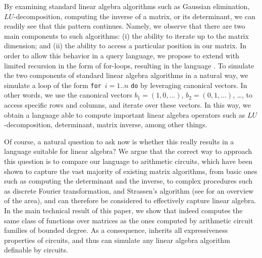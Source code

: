 By
examining standard linear algebra algorithms such as Gaussian elimination, $LU$-decomposition, computing the inverse of a matrix, or its determinant, we can readily see that this pattern continues. Namely, we observe that there are two main components to such algorithms: (i) the ability to iterate up to the matrix dimension; and (ii) the ability to access a particular position in our matrix. In order to allow this behavior in a query language, we propose to extend \lang with limited recursion in the form of for-loops, resulting in the language \langfor. To  simulate the two components of standard linear algebra algorithms in a natural way, we simulate a loop of the form \texttt{for}\, $i=1..n$ \texttt{do} by leveraging canonical vectors. In other words, we use the canonical vectors $b_1=(1,0,\ldots)$, $b_2=(0,1,\ldots)$, \ldots, to access specific rows and columns, and iterate over these vectors. In this way,
we obtain a language able to compute important linear algebra operators such as $LU$-decomposition, determinant, matrix inverse, among other things.

Of course, a natural question to ask now is whether this really results in a language suitable for linear algebra? We argue that the correct way to approach this question is to compare our language to arithmetic circuits, which have been shown to capture the vast majority of existing matrix algorithms, from basic ones such as computing the determinant and the inverse, to complex procedures such as discrete Fourier transformation, and Strassen's algorithm (see \cite{ShpilkaY10,allender} for an overview of the area), and can therefore be considered to effectively capture linear algebra. In the main technical result of this paper, we show that \langfor indeed computes the same class of functions over matrices as the ones computed by arithmetic circuit families of bounded degree.  As a consequence, \langfor inherits all expressiveness properties of circuits, and thus can simulate any linear algebra algorithm definable by circuits.

